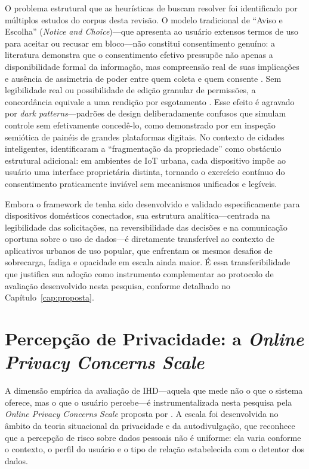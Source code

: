 \documentclass[
	12pt,				%
	oneside,			%
	a4paper,			%
	english,			%
	brazil				%
	]{abntex2ppgsi}
\begin{document}
    O problema estrutural que as heurísticas de  buscam resolver foi identificado por múltiplos estudos do corpus desta revisão. O modelo tradicional de ``Aviso e Escolha'' (\textit{Notice and Choice})---que apresenta ao usuário extensos termos de uso para aceitar ou recusar em bloco---não constitui consentimento genuíno: a literatura demonstra que o consentimento efetivo pressupõe não apenas a disponibilidade formal da informação, mas compreensão real de suas implicações e ausência de assimetria de poder entre quem coleta e quem consente \cite{malgieri2020vulnerable, Jones2017}. Sem legibilidade real ou possibilidade de edição granular de permissões, a concordância equivale a uma rendição por esgotamento \cite{Hutton2017}. Esse efeito é agravado por \textit{dark patterns}---padrões de design deliberadamente confusos que simulam controle sem efetivamente concedê-lo, como demonstrado por  em inspeção semiótica de painéis de grandes plataformas digitais. No contexto de cidades inteligentes,  identificaram a ``fragmentação da propriedade'' como obstáculo estrutural adicional: em ambientes de IoT urbana, cada dispositivo impõe ao usuário uma interface proprietária distinta, tornando o exercício contínuo do consentimento praticamente inviável sem mecanismos unificados e legíveis.

    Embora o framework de  tenha sido desenvolvido e validado especificamente para dispositivos domésticos conectados, sua estrutura analítica---centrada na legibilidade das solicitações, na reversibilidade das decisões e na comunicação oportuna sobre o uso de dados---é diretamente transferível ao contexto de aplicativos urbanos de uso popular, que enfrentam os mesmos desafios de sobrecarga, fadiga e opacidade em escala ainda maior. É essa transferibilidade que justifica sua adoção como instrumento complementar ao protocolo de avaliação desenvolvido nesta pesquisa, conforme detalhado no Capítulo~\ref{cap:proposta}.

   \section{Percepção de Privacidade: a \textit{Online Privacy Concerns Scale}}

    A dimensão empírica da avaliação de IHD---aquela que mede não o que o sistema oferece, mas o que o usuário percebe---é instrumentalizada nesta pesquisa pela \textit{Online Privacy Concerns Scale} proposta por . A escala foi desenvolvida no âmbito da teoria situacional da privacidade e da autodivulgação, que reconhece que a percepção de risco sobre dados pessoais não é uniforme: ela varia conforme o contexto, o perfil do usuário e o tipo de relação estabelecida com o detentor dos dados.
\end{document}
